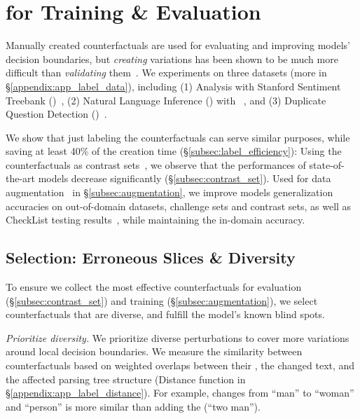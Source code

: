 \section{\sysname for Training \& Evaluation}
\label{sec:app_label}
Manually created counterfactuals are used for evaluating and improving models' decision boundaries, but \emph{creating} variations has been shown to be much more difficult than \emph{validating} them~\cite{ribeiro2018sear}.
We experiments on three datasets (more in \S\ref{appendix:app_label_data}), including
(1) \sst Analysis with Stanford Sentiment Treebank (\dsst)~\cite{socher2013recursive},
(2) Natural Language Inference (\nli) with \dnli~\cite{bowman-etal-2015-large}, and 
(3) Duplicate Question Detection (\dqqp)~\cite{wang2018glue}.

We show that just labeling the \sysname counterfactuals can serve similar purposes, while saving at least 40\% of the creation time (\S\ref{subsec:label_efficiency}):
Using the counterfactuals as contrast sets~\cite{gardner2020contrast}, we observe that the performances of state-of-the-art models decrease significantly (\S\ref{subsec:contrast_set}). 
Used for data augmentation~\cite{kaushik2019learning} in \S\ref{subsec:augmentation}, we improve models generalization accuracies on out-of-domain datasets, challenge sets and contrast sets, as well as CheckList testing results~\cite{checklist:acl20}, while maintaining the in-domain accuracy.


\subsection{Selection: Erroneous Slices \& Diversity }
\label{subsec:gen_counterfactual_for_labeling}

To ensure we collect the most effective counterfactuals for evaluation (\S\ref{subsec:contrast_set}) and training (\S\ref{subsec:augmentation}), we select \sysname counterfactuals that are diverse, and fulfill the model's known blind spots.


\emph{Prioritize diversity.}
We prioritize diverse perturbations to cover more variations around local decision boundaries.
We measure the similarity between counterfactuals based on weighted overlaps between their \tagstrs, the changed text, and the affected parsing tree structure (Distance function in \S\ref{appendix:app_label_distance}). 
For example,  changes from ``man'' to ``woman'' and ``person'' is more similar than adding the  (``two man'').

